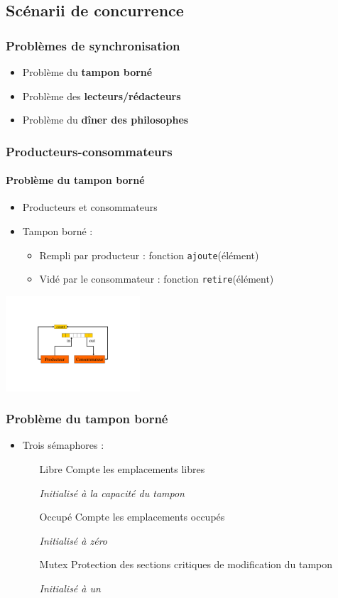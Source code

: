 \subsection{Scénarii de concurrence}

\begin{frame}
\frametitle{Problèmes de synchronisation}
\begin{itemize}
\item Problème du \textbf{tampon borné}
\item Problème des \textbf{lecteurs/rédacteurs}
\item Problème du \textbf{dîner des philosophes}
\end{itemize}
\end{frame}

\begin{frame}
\frametitle{Producteurs-consommateurs}
\framesubtitle{Problème du tampon borné}
\begin{itemize}
\item Producteurs et consommateurs
\item Tampon borné :
\begin{itemize}
\item Rempli par producteur : fonction \texttt{ajoute}(élément)
\item Vidé par le consommateur : fonction \texttt{retire}(élément)
\end{itemize}
\end{itemize}
\begin{center}
\includegraphics[width=5cm]{../illustration/prod_consom_tampon.pdf}
\end{center}
\end{frame}

\begin{frame}
\frametitle{Problème du tampon borné}
\begin{itemize}
\item Trois sémaphores :
\begin{itemize}
\item[Libre] Compte les emplacements libres
\begin{center}\textit{Initialisé à la capacité du tampon}\end{center}
\item[Occupé] Compte les emplacements occupés
\begin{center}\textit{Initialisé à zéro}\end{center}
\item[Mutex] Protection des sections critiques de modification du tampon
\begin{center}\textit{Initialisé à un}\end{center}
\end{itemize}
\end{itemize}
\end{frame}

